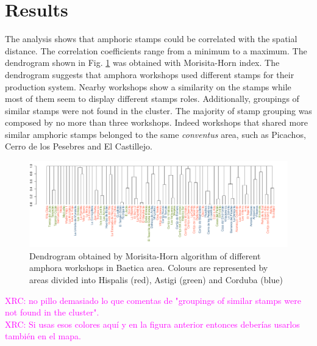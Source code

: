 \documentclass[review]{elsarticle}
\newcommand{\memo}[2]{\textcolor{#1}{#2}}
\newcommand{\xavi}[1]{\memo{magenta}{XRC: #1\\}}
\begin{document}

\section{Results}

The analysis shows that amphoric stamps could be correlated with the spatial distance. The correlation coefficients range from a minimum to a maximum. The dendrogram shown in Fig. \ref{dendro} was obtained with Morisita-Horn index. The dendrogram suggests that amphora workshops used different stamps for their production system. Nearby workshops show a similarity on the stamps while most of them seem to display different stamps roles. Additionally, groupings of similar stamps were not found in the cluster. The majority of stamp grouping was composed by no more than three workshops. Indeed workshops that shared more similar amphoric stamps belonged to the same \textit{conventus} area, such as Picachos, Cerro de los Pesebres and El Castillejo. 

\begin{figure}[htp]
	\centering
\includegraphics[width=\linewidth]{figs/dendro}
\caption{Dendrogram obtained by Morisita-Horn algorithm of different amphora workshops in Baetica area. Colours are represented by areas divided into Hispalis (red), Astigi (green) and Corduba (blue)}
\label{dendro}
\end{figure} 

\xavi{no pillo demasiado lo que comentas de "groupings of similar stamps were not found in the cluster".}
\xavi{Si usas esos colores aquí y en la figura anterior entonces deberías usarlos también en el mapa.}


\end{document}
